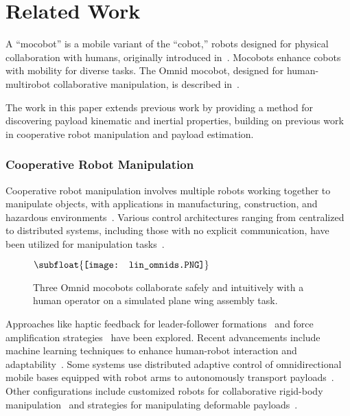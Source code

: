 \section{Related Work}
A ``mocobot'' is a mobile variant of the ``cobot,'' robots designed for physical collaboration with humans, originally introduced in~\cite{colgate1996cobots}. Mocobots enhance cobots with mobility for diverse tasks. The Omnid mocobot, designed for human-multirobot collaborative manipulation, is described in~\cite{elwin2022human}. 

The work in this paper extends previous work by providing a method for discovering payload kinematic and inertial properties, building on previous work in cooperative robot manipulation and payload estimation.
\subsubsection{Cooperative Robot Manipulation}
Cooperative robot manipulation involves multiple robots working together to manipulate objects, with applications in manufacturing, construction, and hazardous environments~\cite{caccavale2016cooperative, cherubini2016collaborative, werfel2014designing, trevelyan2016robotics}. Various control architectures ranging from centralized to distributed systems, including those with no explicit communication, have been utilized for manipulation tasks~\cite{balch1998behavior, rubenstein2014programmable, rus1995moving, liu2024self}.

\begin{figure} 
\centering
$\vcenter{\hbox{\subfloat{\texttt{[image: lin\_omnids.PNG]}}}}$
\caption{Three Omnid mocobots collaborate safely and intuitively with a human operator on a simulated plane wing assembly task.}
\label{fig:demo}
\end{figure}

Approaches like haptic feedback for leader-follower formations~\cite{sieber2015multi} and force amplification strategies~\cite{wang2016force} have been explored. Recent advancements include machine learning techniques to enhance human-robot interaction and adaptability~\cite{chi2023diffusion, zhao2023learning}. Some systems use distributed adaptive control of omnidirectional mobile bases equipped with robot arms to autonomously transport payloads~\cite{ren2020fully, carey2021collective}. Other configurations include customized robots for collaborative rigid-body manipulation~\cite{rauniyar2021mewbots} and strategies for manipulating deformable payloads~\cite{alonso2015local}. 


